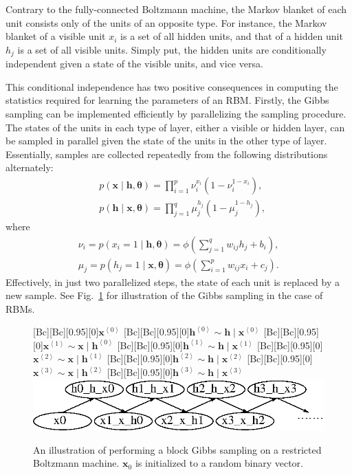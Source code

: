 \documentclass[dissertation,nocontribution,draft*]{aaltoseries}
\newcommand{\qt}[1]{\left<#1\right>}
\newcommand{\vect}[1]{\mathbf{#1}}
\newcommand{\vects}[1]{\boldsymbol{#1}}
\newcommand{\vh}[0]{\vect{h}}
\newcommand{\vx}[0]{\vect{x}}
\newcommand{\TT}[0]{{\vects{\theta}}}
\begin{document}
Contrary to the fully-connected Boltzmann machine, the
Markov blanket of each unit consists only of the units of an
opposite type.  For instance, the Markov blanket of a
visible unit $x_i$ is a set of all hidden units, and that of
a hidden unit $h_j$ is a set of all visible units. Simply
put, the hidden units are conditionally independent given a
state of the visible units, and vice versa.

This conditional independence has two positive consequences
in computing the statistics required for learning the
parameters of an RBM.  Firstly, the Gibbs sampling can be
implemented efficiently by parallelizing the sampling
procedure. The states of the units in each type of layer,
either a visible or hidden layer, can be sampled in parallel
given the state of the units in the other type of layer.
Essentially, samples are collected repeatedly from the
following distributions alternately:
\begin{align}
    \label{eq:rbm_cond_x}
    &p(\vx \mid \vh, \TT) = \prod_{i=1}^p \nu_i^{x_i} (1 -
    \nu_i^{1 - x_i}), \\
    \label{eq:rbm_cond_h}
    &p(\vh \mid \vx, \TT) = \prod_{j=1}^q \mu_j^{h_j} (1 -
    \mu_j^{1 - h_j}),
\end{align}
where
\begin{align*}
    \nu_i = p(x_i = 1 \mid \vh, \TT) = \phi\left( \sum_{j=1}^q
    w_{ij} h_j + b_i \right), \\
    \mu_j = p(h_j = 1 \mid \vx, \TT) = \phi\left( \sum_{i=1}^p
    w_{ij} x_i + c_j \right).
\end{align*}
Effectively, in just two parallelized steps, the state of
each unit is replaced by a new sample.  See
Fig.~\ref{fig:rbm_gibbs} for illustration of the Gibbs
sampling in the case of RBMs.

\begin{figure}[t]
    \centering
    [Bc][Bc][0.95][0]{$\vx^{\qt{0}}$}
    [Bc][Bc][0.95][0]{$\vh^{\qt{0}}\sim \vh \mid \vx^{\qt{0}}$}
    [Bc][Bc][0.95][0]{$\vx^{\qt{1}}\sim \vx \mid \vh^{\qt{0}}$}
    [Bc][Bc][0.95][0]{$\vh^{\qt{1}}\sim \vh \mid \vx^{\qt{1}}$}
    [Bc][Bc][0.95][0]{$\vx^{\qt{2}}\sim \vx \mid \vh^{\qt{1}}$}
    [Bc][Bc][0.95][0]{$\vh^{\qt{2}}\sim \vh \mid \vx^{\qt{2}}$}
    [Bc][Bc][0.95][0]{$\vx^{\qt{3}}\sim \vx \mid \vh^{\qt{2}}$}
    [Bc][Bc][0.95][0]{$\vh^{\qt{3}}\sim \vh \mid \vx^{\qt{3}}$}
    \includegraphics[width=0.95\columnwidth]{figures/bgibbs.eps}
    \caption{An illustration of performing a block Gibbs
    sampling on a restricted Boltzmann machine. $\vx_0$ is
    initialized to a random binary vector.}
    \label{fig:rbm_gibbs}
\end{figure}
\end{document}
